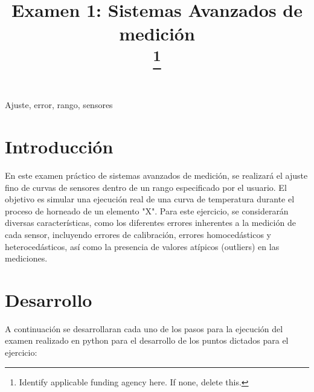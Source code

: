 \documentclass[conference]{IEEEtran}
\begin{document}
\title{Examen 1: Sistemas Avanzados de medici\'on\\
\thanks{Identify applicable funding agency here. If none, delete this.}
}

\author{
\and
{}

}

\maketitle

\begin{IEEEkeywords}
Ajuste, error, rango, sensores
\end{IEEEkeywords}

\section{Introducción}

En este examen práctico de sistemas avanzados de medición, se realizará el ajuste fino de curvas de sensores dentro de un rango especificado por el usuario. El objetivo es simular una ejecución real de una curva de temperatura durante el proceso de horneado de un elemento "X". Para este ejercicio, se considerarán diversas características, como los diferentes errores inherentes a la medición de cada sensor, incluyendo errores de calibración, errores homocedásticos y heterocedásticos, así como la presencia de valores atípicos (outliers) en las mediciones.



\section{Desarrollo}

A continuación se desarrollaran cada uno de los pasos para la ejecución del examen realizado en python para el desarrollo de los puntos dictados para el ejercicio:\\
\end{document}
